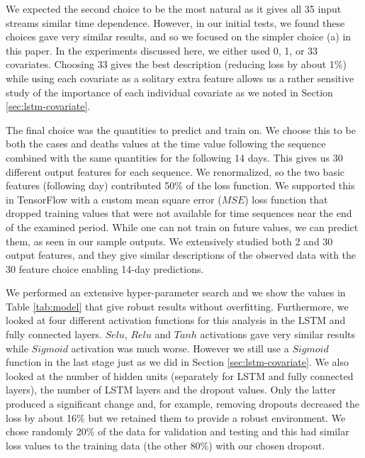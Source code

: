 \documentclass[12pt]{article}
\theoremstyle{definition}
\renewcommand{\_}{%
    \textunderscore\hspace{0pt}%
}
\begin{document}
We expected the second choice to be the most natural as it gives all
35 input streams similar time dependence. However, in our initial
tests, we found these choices gave very similar results, and so we
focused on the simpler choice (a) in this paper. In the experiments discussed
here, we either used 0, 1, or 33 covariates. Choosing 33 gives the best
description (reducing loss by about 1\%) while using each covariate as
a solitary extra feature allows us a rather sensitive study of the
importance of each individual covariate as we noted in Section \ref{sec:lstm-covariate}.

The final choice was the quantities to predict and train
on. We choose this to be both the cases and deaths values at the
time value following the sequence combined with the same quantities
for the following 14 days. This gives us 30 different output features
for each sequence. We renormalized, so the two basic features
(following day) contributed 50\% of the loss function. We supported
this in TensorFlow with a custom mean square error ($MSE$) loss
function that dropped training values that were not available for time
sequences near the end of the examined period. While one can not
train on future values, we can predict them, as seen in our sample
outputs. We extensively studied both 2 and 30 output features, and they
give similar descriptions of the observed data with the 30 feature
choice enabling 14-day predictions.

We performed an extensive hyper-parameter search and we show the values
in Table \ref{tab:model} that give robust results without
overfitting. Furthermore, we looked at four different activation functions for 
this analysis in the
LSTM and fully connected layers. $Selu$, $Relu$ and $Tanh$ activations gave
very similar results while $Sigmoid$ activation was much worse. However we still use a $Sigmoid$ function in the last stage just as we did in Section \ref{sec:lstm-covariate}. We also looked at the number of hidden units (separately for LSTM and fully
connected layers), the number of LSTM layers and the dropout values.
Only the latter produced a significant change and, for example, removing
dropouts decreased the loss by about 16\% but we retained them to provide
a robust environment. We chose randomly 20\% of the data for
validation and testing and this had similar loss values to the
training data (the other 80\%) with our chosen dropout.
\end{document}
